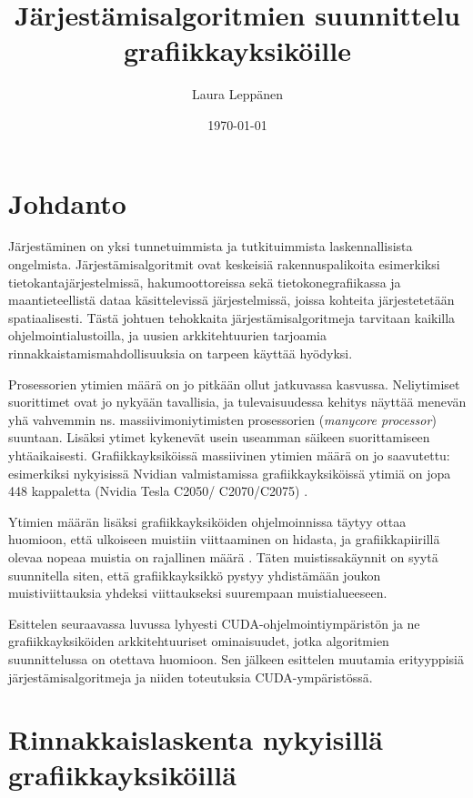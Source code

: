 \documentclass[a4paper,11pt]{article}
\newcommand{\engl}[1]{\foreignlanguage{english}{\em #1}}
\begin{document}
\title{Järjestämisalgoritmien suunnittelu grafiikkayksiköille}
\author{Laura Leppänen}
\date{\today}
\maketitle
\thispagestyle{empty}

\tableofcontents
\onehalfspacing

\newpage
\setcounter{page}{1}

\section{Johdanto}

Järjestäminen on yksi tunnetuimmista ja tutkituimmista laskennallisista ongelmista. Järjestämisalgoritmit ovat keskeisiä rakennuspalikoita esimerkiksi tietokantajärjestelmissä, hakumoottoreissa sekä tietokonegrafiikassa ja maantieteellistä dataa käsittelevissä järjestelmissä, joissa kohteita järjestetetään spatiaalisesti. Tästä johtuen tehokkaita järjestämisalgoritmeja tarvitaan kaikilla ohjelmointialustoilla, ja uusien arkkitehtuurien tarjoamia rinnakkaistamismahdollisuuksia on tarpeen käyttää hyödyksi.

Prosessorien ytimien määrä on jo pitkään ollut jatkuvassa kasvussa. Neliytimiset suorittimet ovat jo nykyään tavallisia, ja tulevaisuudessa kehitys näyttää menevän yhä vahvemmin ns. massiivimoniytimisten prosessorien (\engl{manycore processor}) suuntaan. Lisäksi ytimet kykenevät usein useamman säikeen suorittamiseen yhtäaikaisesti. Grafiikkayksiköissä massiivinen ytimien määrä on jo saavutettu: esimerkiksi nykyisissä Nvidian valmistamissa grafiikkayksiköissä ytimiä on jopa 448 kappaletta (Nvidia Tesla C2050/ C2070/C2075) \cite{nvidiafermi2010}.

Ytimien määrän lisäksi grafiikkayksiköiden ohjelmoinnissa täytyy ottaa huomioon, että ulkoiseen muistiin viittaaminen on hidasta, ja grafiikkapiirillä olevaa nopeaa muistia on rajallinen määrä \cite{leischner2010}. Täten muistissakäynnit on syytä suunnitella siten, että grafiikkayksikkö pystyy yhdistämään joukon muistiviittauksia yhdeksi viittaukseksi suurempaan muistialueeseen.

Esittelen seuraavassa luvussa lyhyesti CUDA-ohjelmointiympäristön ja ne grafiikkayksiköiden arkkitehtuuriset ominaisuudet, jotka algoritmien suunnittelussa on otettava huomioon. Sen jälkeen esittelen muutamia erityyppisiä järjestämisalgoritmeja ja niiden toteutuksia CUDA-ympäristössä.

\section{Rinnakkaislaskenta nykyisillä grafiikkayksiköillä}
\end{document}
